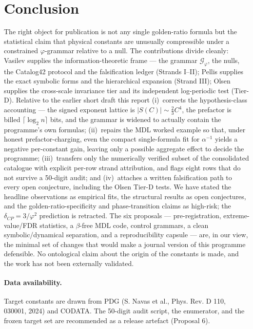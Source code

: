 \documentclass[11pt]{article}
\newcommand{\phigr}{\varphi}
\begin{document}
\section{Conclusion}\label{sec:conclusion}
The right object for publication is not any single golden-ratio formula but the statistical claim that physical constants are unusually compressible under a constrained $\phigr$-grammar relative to a null. The contributions divide cleanly: Vasilev supplies the information-theoretic frame --- the grammar $\mathcal{G}_{\phigr}$, the nulls, the Catalog42 protocol and the falsification ledger (Strands I--II); Pellis supplies the exact symbolic forms and the hierarchical expansion (Strand III); Olsen supplies the cross-scale invariance tier and its independent log-periodic test (Tier-D). Relative to the earlier short draft this report (i)~corrects the hypothesis-class accounting --- the signed exponent lattice is $|S(C)| \sim \tfrac{2}{3}C^4$, the prefactor is billed $\lceil \log_2 n \rceil$ bits, and the grammar is widened to actually contain the programme's own formulas; (ii)~repairs the MDL worked example so that, under honest prefactor-charging, even the compact single-formula fit for $\alpha^{-1}$ yields a negative per-constant gain, leaving only a possible aggregate effect to decide the programme; (iii)~transfers only the numerically verified subset of the consolidated catalogue with explicit per-row strand attribution, and flags eight rows that do not survive a 50-digit audit; and (iv)~attaches a written falsification path to every open conjecture, including the Olsen Tier-D tests. We have stated the headline observations as empirical fits, the structural results as open conjectures, and the golden-ratio-specificity and phase-transition claims as high-risk; the $\delta_{CP} = 3/\phigr^2$ prediction is retracted. The six proposals --- pre-registration, extreme-value/FDR statistics, a $\beta$-free MDL code, control grammars, a clean symbolic/dynamical separation, and a reproducibility capsule --- are, in our view, the minimal set of changes that would make a journal version of this programme defensible. No ontological claim about the origin of the constants is made, and the work has not been externally validated.

\paragraph{Data availability.} Target constants are drawn from PDG (S. Navas et al., Phys. Rev. D 110, 030001, 2024) and CODATA. The 50-digit audit script, the enumerator, and the frozen target set are recommended as a release artefact (Proposal 6).
\end{document}
